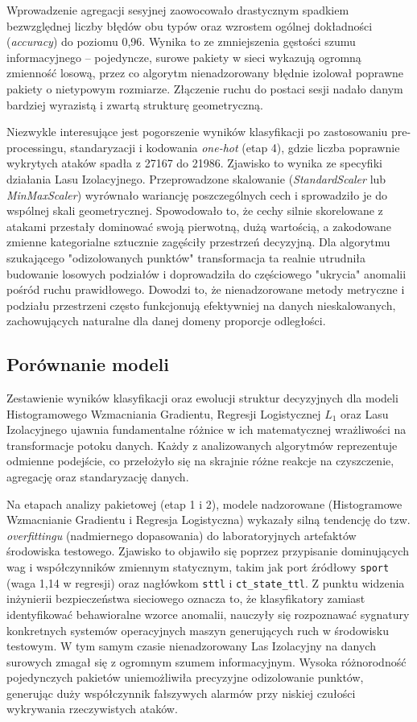 \documentclass[12pt,twoside]{article}
\begin{document}
Wprowadzenie agregacji sesyjnej zaowocowało drastycznym spadkiem bezwzględnej liczby błędów obu typów oraz wzrostem ogólnej dokładności (\emph{accuracy}) do poziomu 0,96. 
Wynika to ze zmniejszenia gęstości szumu informacyjnego – pojedyncze, surowe pakiety w sieci wykazują ogromną zmienność losową, przez co algorytm nienadzorowany błędnie izolował poprawne pakiety o nietypowym rozmiarze. 
Złączenie ruchu do postaci sesji nadało danym bardziej wyrazistą i zwartą strukturę geometryczną.

Niezwykle interesujące jest pogorszenie wyników klasyfikacji po zastosowaniu pre-processingu, standaryzacji i kodowania \emph{one-hot} (etap 4), gdzie liczba poprawnie wykrytych ataków spadła z 27167 do 21986. 
Zjawisko to wynika ze specyfiki działania Lasu Izolacyjnego. 
Przeprowadzone skalowanie (\emph{StandardScaler} lub \emph{MinMaxScaler}) wyrównało wariancję poszczególnych cech i sprowadziło je do wspólnej skali geometrycznej. 
Spowodowało to, że cechy silnie skorelowane z atakami przestały dominować swoją pierwotną, dużą wartością, a zakodowane zmienne kategorialne sztucznie zagęściły przestrzeń decyzyjną. 
Dla algorytmu szukającego "odizolowanych punktów" transformacja ta realnie utrudniła budowanie losowych podziałów i doprowadziła do częściowego "ukrycia" anomalii pośród ruchu prawidłowego. 
Dowodzi to, że nienadzorowane metody metryczne i podziału przestrzeni często funkcjonują efektywniej na danych nieskalowanych, zachowujących naturalne dla danej domeny proporcje odległości.

\subsection{Porównanie modeli}

Zestawienie wyników klasyfikacji oraz ewolucji struktur decyzyjnych dla modeli Histogramowego Wzmacniania Gradientu, Regresji Logistycznej $L_1$ oraz Lasu Izolacyjnego ujawnia fundamentalne różnice w ich matematycznej wrażliwości na transformacje potoku danych.
Każdy z analizowanych algorytmów reprezentuje odmienne podejście, co przełożyło się na skrajnie różne reakcje na czyszczenie, agregację oraz standaryzację danych.

Na etapach analizy pakietowej (etap 1 i 2), modele nadzorowane (Histogramowe Wzmacnianie Gradientu i Regresja Logistyczna) wykazały silną tendencję do tzw. \emph{overfittingu} (nadmiernego dopasowania) do laboratoryjnych artefaktów środowiska testowego. 
Zjawisko to objawiło się poprzez przypisanie dominujących wag i współczynników zmiennym statycznym, takim jak port źródłowy \texttt{sport} (waga 1,14 w regresji) oraz nagłówkom \texttt{sttl} i \texttt{ct\_state\_ttl}. 
Z punktu widzenia inżynierii bezpieczeństwa sieciowego oznacza to, że klasyfikatory zamiast identyfikować behawioralne wzorce anomalii, nauczyły się rozpoznawać sygnatury konkretnych systemów operacyjnych maszyn generujących ruch w środowisku testowym. 
W tym samym czasie nienadzorowany Las Izolacyjny na danych surowych zmagał się z ogromnym szumem informacyjnym. Wysoka różnorodność pojedynczych pakietów uniemożliwiła precyzyjne odizolowanie punktów, generując duży współczynnik fałszywych alarmów przy niskiej czułości wykrywania rzeczywistych ataków.
\end{document}
